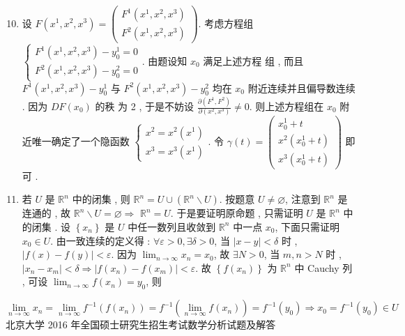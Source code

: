 \documentclass[10pt]{article}
\begin{document}
\begin{enumerate}
  \setcounter{enumi}{9}
  \item  设  $F\left(x^{1}, x^{2}, x^{3}\right)=\left(\begin{array}{l}F^{1}\left(x^{1}, x^{2}, x^{3}\right) \\ F^{2}\left(x^{1}, x^{2}, x^{3}\right)\end{array}\right)$.  考虑方程组  $\left\{\begin{array}{l}F^{1}\left(x^{1}, x^{2}, x^{3}\right)-y_{0}^{1}=0 \\ F^{2}\left(x^{1}, x^{2}, x^{3}\right)-y_{0}^{2}=0\end{array}\right.$.  由题设知  $x_{0}$  满足上述方程   组 ,  而且  $F^{1}\left(x^{1}, x^{2}, x^{3}\right)-y_{0}^{1}$  与  $F^{2}\left(x^{1}, x^{2}, x^{3}\right)-y_{0}^{2}$  均在  $x_{0}$  附近连续并且偏导数连续 .  因为  $D F\left(x_{0}\right)$  的秩   为  2 ,  于是不妨设  $\frac{\partial\left(F^{1}, F^{2}\right)}{\partial\left(x^{2}, x^{3}\right)} \neq 0$.  则上述方程组在  $x_{0}$  附近唯一确定了一个隐函数  $\left\{\begin{array}{l}x^{2}=x^{2}\left(x^{1}\right) \\ x^{3}=x^{3}\left(x^{1}\right)\end{array}\right.$.  令  $\gamma(t)=\left(\begin{array}{c}x_{0}^{1}+t \\ x^{2}\left(x_{0}^{1}+t\right) \\ x^{3}\left(x_{0}^{1}+t\right)\end{array}\right)$  即可 .

  \item  若  $U$  是  $\mathbb{R}^{n}$  中的闭集 ,  则  $\mathbb{R}^{n}=U \cup\left(\mathbb{R}^{n} \backslash U\right)$.  按题意  $U \neq \varnothing$,  注意到  $\mathbb{R}^{n}$  是连通的 ,  故  $\mathbb{R}^{n} \backslash U=\varnothing \Rightarrow$ $\mathbb{R}^{n}=U$.  于是要证明原命题 ,  只需证明  $U$  是  $\mathbb{R}^{n}$  中的闭集 .  设  $\left\{x_{n}\right\}$  是  $U$  中任一数列且收敛到  $\mathbb{R}^{n}$  中一点  $x_{0}$,  下面只需证明  $x_{0} \in U$.  由一致连续的定义得 : $\forall \varepsilon>0, \exists \delta>0$,  当  $|x-y|<\delta$  时 , $|f(x)-f(y)|<\varepsilon$.  因为  $\lim _{n \rightarrow \infty} x_{n}=x_{0}$,  故  $\exists N>0$,  当  $m, n>N$  时 , $\left|x_{n}-x_{m}\right|<\delta \Longrightarrow\left|f\left(x_{n}\right)-f\left(x_{m}\right)\right|<\varepsilon$.  故  $\left\{f\left(x_{n}\right)\right\}$  为  $\mathbb{R}^{n}$  中  Cauchy  列 ,  可设  $\lim _{n \rightarrow \infty} f\left(x_{n}\right)=y_{0}$,  则 

\end{enumerate}
$$
\lim _{n \rightarrow \infty} x_{n}=\lim _{n \rightarrow \infty} f^{-1}\left(f\left(x_{n}\right)\right)=f^{-1}\left(\lim _{n \rightarrow \infty} f\left(x_{n}\right)\right)=f^{-1}\left(y_{0}\right) \Longrightarrow x_{0}=f^{-1}\left(y_{0}\right) \in U
$$
 北京大学  2016  年全国硕士研究生招生考试数学分析试题及解答     
\end{document}
